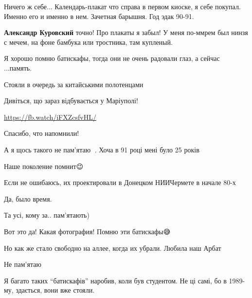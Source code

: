 
Ничего ж себе... Календарь-плакат что справа в первом киоске, я себе покупал.
Именно его и именно в нем. Зачетная барышня. Год эдак 90-91.

\begin{itemize} %
\textbf{Александр Куровский} точно! Про плакаты я забыл! У меня по-ммрем был нинзя с мечем, на фоне бамбука или тростника, там купленый.
\end{itemize} %


Я хорошо помню батискафы, тогда они не очень радовали глаз, а сейчас ...память.


Стояли в очередь за китайськими полотенцами


Дивіться, що зараз відбувається у Маріуполі!

\url{https://fb.watch/iFXZcsfvHL/}


Спасибо, что напомнили!


А я щось такого не пам'ятаю 🤷. Хоча в 91 році мені було 25 років


Наше поколение помнит😉🤗


Если не ошибаюсь, их проектировали в Донецком НИИЧермете в начале 80-х


Да, было время.


Та усі, кому за.. пам'ятають)


Вот это да! Какая фотография! Помню эти батискафы😅🥳

Но как же стало свободно на аллее, когда их убрали. Любила наш Арбат


Не пам'ятаю


Я багато таких \enquote{батискафів} наробив, коли був студентом. Не ці самі, бо
в 1989-му, здається, вони вже стояли.


